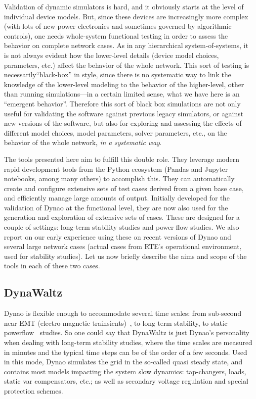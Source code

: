 \documentclass[conference]{IEEEtran}
\newcommand{\Dynawo}{Dyna\textomega o} %
\begin{document}
Validation of dynamic simulators is hard, and it obviously starts at the level
of individual device models. But, since these devices are increasingly more
complex (with lots of new power electronics and sometimes governed by
algorithmic controls), one needs whole-system functional testing in order to
assess the behavior on complete network cases. As in any hierarchical
system-of-systems, it is not always evident how the lower-level details (device
model choices, parameters, etc.)  affect the behavior of the whole network. This
sort of testing is necessarily``black-box'' in style, since there is no
systematic way to link the knowledge of the lower-level modeling to the behavior
of the higher-level, other than running simulations---in a certain limited
sense, what we have here is an ``emergent behavior''.  Therefore this sort of
black box simulations are not only useful for validating the software against
previous legacy simulators, or against new versions of the software, but also
for exploring and assessing the effects of different model choices, model
parameters, solver parameters, etc., on the behavior of the whole network,
\emph{in a systematic way}.

The tools presented here aim to fulfill this double role. They leverage modern
rapid development tools from the Python ecosystem (Pandas and Jupyter notebooks,
among many others) to accomplish this. They can automatically create and
configure extensive sets of test cases derived from a given base case, and
efficiently manage large amounts of output. Initially developed for the
validation of \Dynawo{} at the functional level, they are now also used for the
generation and exploration of extensive sets of cases. These are designed for a
couple of settings: long-term stability studies and power flow studies. We also
report on our early experience using these on recent versions of \Dynawo{} and
several large network cases (actual cases from RTE's operational environment,
used for stability studies). Let us now briefly describe the aims and scope of
the tools in each of these two cases.



\subsection{DynaWaltz}

\Dynawo{} is flexible enough to accommodate several time scales: from sub-second
near-EMT (electro-magnetic trainsients)~\cite{Masoon21}, to long-term stability,
to static powerflow~\cite{Cossart21} studies.  So one could say that DynaWaltz
is just \Dynawo's personality when dealing with long-term stability studies,
where the time scales are measured in minutes and the typical time steps can be
of the order of a few seconds. Used in this mode, \Dynawo{} simulates the grid
in the so-called quasi steady state, and contains most models impacting the
system slow dynamics: tap-changers, loads, static var compensators, etc.; as
well as secondary voltage regulation and special protection schemes.
\end{document}
